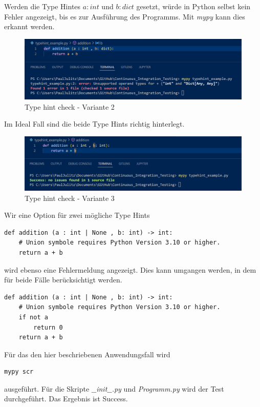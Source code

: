 Werden die Type Hintes $a:int$ und $b:dict$ gesetzt, würde in Python selbst kein Fehler angezeigt, bis es zur Ausführung des Programms. Mit \textit{mypy} kann dies erkannt werden.
\begin{figure}[H]
	\centering
	\includegraphics[scale = 0.6]{attachment/chapter_2/Scc079}
	\caption{Type hint check - Variante 2}
\end{figure}
Im Ideal Fall sind die beide Type Hints richtig hinterlegt.
\begin{figure}[H]
	\centering
	\includegraphics[scale = 0.6]{attachment/chapter_2/Scc080}
	\caption{Type hint check - Variante 3}
\end{figure}

Wir eine Option für zwei mögliche Type Hints
\begin{lstlisting}[style=python]
def addition (a : int | None , b: int) -> int:
	# Union symbole requires Python Version 3.10 or higher. 
	return a + b
\end{lstlisting}
wird ebenso eine Fehlermeldung angezeigt. Dies kann umgangen werden, in dem für beide Fälle berücksichtigt werden.
\begin{lstlisting}[style=python]
def addition (a : int | None , b: int) -> int:
	# Union symbole requires Python Version 3.10 or higher. 
	if not a
		return 0 
	return a + b
\end{lstlisting} 

Für das den hier beschriebenen Anwendungsfall wird 
\begin{lstlisting}[style=CMD]
mypy scr
\end{lstlisting}
ausgeführt. Für die Skripte \textit{$\_\_$init$\_\_$.py} und \textit{Programm.py} wird der Test durchgeführt. Das Ergebnis ist \textcolor{vbagreen}{Success}.\\


